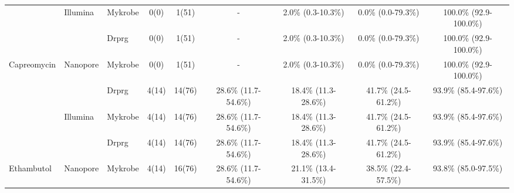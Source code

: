 \begin{table}
{\begin{tabular}{|l|l|l|c|c|c|c|c|c|}
                               & \multirow{-2}{*}{Illumina} & Mykrobe                       & 0(0)                          & 1(51)                          & -                                            & 2.0\% (0.3-10.3\%)                           & 0.0\% (0.0-79.3\%)                           & 100.0\% (92.9-100.0\%)                         \\ \cline{2-9} 
                               &                            & \cellcolor[HTML]{EFEFEF}Drprg & \cellcolor[HTML]{EFEFEF}0(0)  & \cellcolor[HTML]{EFEFEF}1(51)  & \cellcolor[HTML]{EFEFEF}-                    & \cellcolor[HTML]{EFEFEF}2.0\% (0.3-10.3\%)   & \cellcolor[HTML]{EFEFEF}0.0\% (0.0-79.3\%)   & \cellcolor[HTML]{EFEFEF}100.0\% (92.9-100.0\%) \\ \cline{3-9} 
\multirow{-4}{*}{Capreomycin}  & \multirow{-2}{*}{Nanopore} & Mykrobe                       & 0(0)                          & 1(51)                          & -                                            & 2.0\% (0.3-10.3\%)                           & 0.0\% (0.0-79.3\%)                           & 100.0\% (92.9-100.0\%)                         \\ \hline
                               &                            & \cellcolor[HTML]{EFEFEF}Drprg & \cellcolor[HTML]{EFEFEF}4(14) & \cellcolor[HTML]{EFEFEF}14(76) & \cellcolor[HTML]{EFEFEF}28.6\% (11.7-54.6\%) & \cellcolor[HTML]{EFEFEF}18.4\% (11.3-28.6\%) & \cellcolor[HTML]{EFEFEF}41.7\% (24.5-61.2\%) & \cellcolor[HTML]{EFEFEF}93.9\% (85.4-97.6\%)   \\ \cline{3-9} 
                               & \multirow{-2}{*}{Illumina} & Mykrobe                       & 4(14)                         & 14(76)                         & 28.6\% (11.7-54.6\%)                         & 18.4\% (11.3-28.6\%)                         & 41.7\% (24.5-61.2\%)                         & 93.9\% (85.4-97.6\%)                           \\ \cline{2-9} 
                               &                            & \cellcolor[HTML]{EFEFEF}Drprg & \cellcolor[HTML]{EFEFEF}4(14) & \cellcolor[HTML]{EFEFEF}14(76) & \cellcolor[HTML]{EFEFEF}28.6\% (11.7-54.6\%) & \cellcolor[HTML]{EFEFEF}18.4\% (11.3-28.6\%) & \cellcolor[HTML]{EFEFEF}41.7\% (24.5-61.2\%) & \cellcolor[HTML]{EFEFEF}93.9\% (85.4-97.6\%)   \\ \cline{3-9} 
\multirow{-4}{*}{Ethambutol}   & \multirow{-2}{*}{Nanopore} & Mykrobe                       & 4(14)                         & 16(76)                         & 28.6\% (11.7-54.6\%)                         & 21.1\% (13.4-31.5\%)                         & 38.5\% (22.4-57.5\%)                         & 93.8\% (85.0-97.5\%)                           \\ \hline

\end{tabular}}
\end{table}
